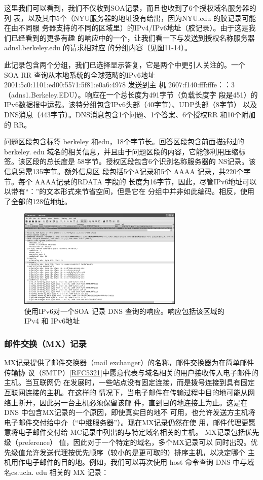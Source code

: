 这里我们可以看到，我们不仅收到SOA记录，而且也收到了6个授权域名服务器的列
表，以及其中5个（NYU服务器的地址没有给出，因为NYU.edu 的胶记录可能在由不同服
务器支持的不同的区域里）的IPv4/IPv6地址（胶记录）。由于这是我们已经看到的更多有趣
的响应中的一个，让我们看一下与发送到授权名称服务器 adnsl.berkeley.edu 的请求相对应
的分组内容（见图11-14）。

此记录包含两个分组，我们已选择显示答复，它是两个中更引人关注的。一个 SOA RR
查询从本地系统的全球范畴的IPv6地址2001:5c0:1101:ed00:5571:5f81:e0a6:4978 发送到主
机 2607:f140:fff:fffe：：3 （adns1.Berkeley.EDU）。响应在一个总长度为491字节（负载长度字
段是451）的IPv6数据报中运载。该特分组包含IPv6头部（40字节）、UDP头部（8字节）
以及 DNS消息（443字节）。DNS消息包含1个问题、1个答案、6个授权RR 和10个附加
的 RR。

问题区段包含标签 berkeley 和edu，18个字节长。回答区段包含前面描述过的 berkeley.
edu 域名的相关信息，并且由于问题区段的内容，它能够利用压缩标签。该区段的总长度是
58字节。授权区段包含6个识别名称服务器的 NS记录。该信息另需135字节。额外信息区
段包括5个A记录和5个 AAAA 记录，共220个字节。每个 AAAA记录的RDATA 字段的
长度为16字节，因此，尽管IPv6地址可以以带有“：”的文本形式来节省空间，但是它在
分组中并非如此编码。相反，使用了全部的128位地址。

\begin{figure}[!htb]
  \centering
  \includegraphics[width=0.7\textwidth]{imgs/11/11-14.png}
  \caption{使用IPv6对一个SOA 记录 DNS 查询的响应。响应包括该区域的 IPv4 和 IPv6地址}
\end{figure}

\subsubsection{邮件交换（MX）记录}

MX记录提供了邮件交换器（mail exchanger）的名称，邮件交换器为在简单邮件传输协
议（SMTP）\href{https://www.rfc-editor.org/rfc/rfc5321}{[RFC5321]}中愿意代表与域名相关的用户接收传入电子邮件的主机。当互联网仍
在发展时，一些站点没有固定连接，而是拨号连接到具有固定互联网连接的主机。在这样的
情况下，当电子邮件在传输过程中目的地可能从网络上断开，因此另一台主机必须保留该邮
件，直到目的地连接上为止。这是在 DNS 中包含MX记录的一个原因，即使真实目的地不
可用，也允许发送方主机将电子邮件交付给中介（“中继服务器”）。现在MX记录仍然在使
用，邮件代理更愿意将电子邮件交付给 MC记录中列出的与特定域名相关的主机。
MX记录包括优先级（preference） 值，因此对于一个特定的域名，多个MX记录可以
同时出现。优先级值允许发送代理按优先顺序（较小的是更可取的）排序主机，以决定哪个
主机用作电子邮件的目的地。例如，我们可以再次使用 host 命令查询 DNS 中与域名cs.ucla.
edu 相关的 MX 记录：

